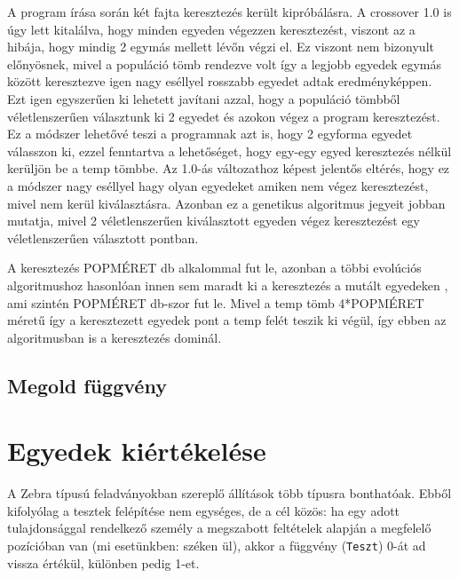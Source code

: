 \documentclass[12ppt,a4paper,oneside]{report}
\begin{document}
            A program írása során két fajta keresztezés került kipróbálásra.
            A crossover 1.0 is úgy lett kitalálva, hogy minden egyeden végezzen keresztezést, viszont az a hibája, hogy mindig 2 egymás mellett lévőn végzi el.
            Ez viszont nem bizonyult előnyösnek, mivel a populáció tömb rendezve volt így a legjobb egyedek egymás között keresztezve igen nagy eséllyel rosszabb egyedet adtak eredményképpen.
            Ezt igen egyszerűen ki lehetett javítani azzal, hogy a populáció tömbből véletlenszerűen választunk ki 2 egyedet és azokon végez a program keresztezést.
            Ez a módszer lehetővé teszi a programnak azt is, hogy 2 egyforma egyedet válasszon ki, ezzel fenntartva a lehetőséget, hogy egy-egy egyed keresztezés nélkül kerüljön be a temp tömbbe.
            Az 1.0-ás változathoz képest jelentős eltérés, hogy ez a módszer nagy eséllyel hagy olyan egyedeket amiken nem végez keresztezést, mivel nem kerül kiválasztásra.
            Azonban ez a genetikus algoritmus jegyeit jobban mutatja, mivel 2 véletlenszerűen kiválasztott egyeden végez keresztezést egy véletlenszerűen választott pontban.
            
            
            A keresztezés POPMÉRET db alkalommal fut le, azonban a többi evolúciós algoritmushoz hasonlóan innen sem maradt ki a keresztezés a mutált egyedeken , ami szintén POPMÉRET db-szor fut le.
            Mivel a temp tömb 4*POPMÉRET méretű így a keresztezett egyedek pont a temp felét teszik ki végül, így ebben az algoritmusban is a keresztezés dominál.

        \subsection{Megold függvény} %

    \section{Egyedek kiértékelése} %
	A Zebra típusú feladványokban szereplő állítások több típusra bonthatóak. Ebből kifolyólag a tesztek felépítése nem egységes, de a cél közös: ha egy adott tulajdonsággal rendelkező személy a megszabott feltételek alapján a megfelelő pozícióban van (mi esetünkben: széken ül), akkor a függvény (\texttt{Teszt}) 0-át ad vissza értékül, különben pedig 1-et.
\end{document}
